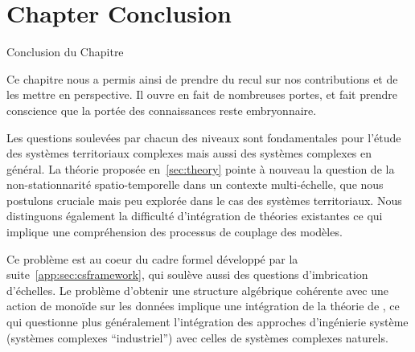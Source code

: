 



\newpage


\section*{Chapter Conclusion}{Conclusion du Chapitre}




Ce chapitre nous a permis ainsi de prendre du recul sur nos contributions et de les mettre en perspective. Il ouvre en fait de nombreuses portes, et fait prendre conscience que la portée des connaissances reste embryonnaire.


Les questions soulevées par chacun des niveaux sont fondamentales pour l'étude des systèmes territoriaux complexes mais aussi des systèmes complexes en général. La théorie proposée en~\ref{sec:theory} pointe à nouveau la question de la non-stationnarité spatio-temporelle dans un contexte multi-échelle, que nous postulons cruciale mais peu explorée dans le cas des systèmes territoriaux. Nous distinguons également la difficulté d'intégration de théories existantes ce qui implique une compréhension des processus de couplage des modèles.

Ce problème est au coeur du cadre formel développé par la suite~\ref{app:sec:csframework}, qui soulève aussi des questions d'imbrication d'échelles. Le problème d'obtenir une structure algébrique cohérente avec une action de monoïde sur les données implique une intégration de la théorie de , ce qui questionne plus généralement l'intégration des approches d'ingénierie système (systèmes complexes ``industriel'') avec celles de systèmes complexes naturels.

